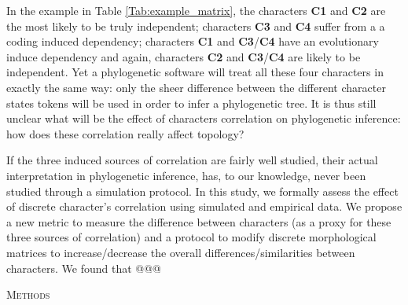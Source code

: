 \documentclass[12pt,letterpaper]{article}
\renewcommand{\section}[1]{%
\bigskip
\begin{center}
\begin{Large}
\normalfont\scshape #1
\medskip
\end{Large}
\end{center}}
\begin{document}
In the example in Table \ref{Tab:example_matrix}, the characters \textbf{C1} and \textbf{C2} are the most likely to be truly independent; characters \textbf{C3} and \textbf{C4} suffer from a a coding induced dependency; characters \textbf{C1} and \textbf{C3}/\textbf{C4} have an evolutionary induce dependency and again, characters \textbf{C2} and \textbf{C3}/\textbf{C4} are likely to be independent.
Yet a phylogenetic software will treat all these four characters in exactly the same way: only the sheer difference between the different character states tokens will be used in order to infer a phylogenetic tree.
It is thus still unclear what will be the effect of characters correlation on phylogenetic inference: how does these correlation really affect topology?

If the three induced sources of correlation are fairly well studied, their actual interpretation in phylogenetic inference, has, to our knowledge, never been studied through a simulation protocol.
In this study, we formally assess the effect of discrete character's correlation using simulated and empirical data.
We propose a new metric to measure the difference between characters (as a proxy for these three sources of correlation) and a protocol to modify discrete morphological matrices to increase/decrease the overall differences/similarities between characters.
We found that @@@




\section{Methods}
\end{document}
